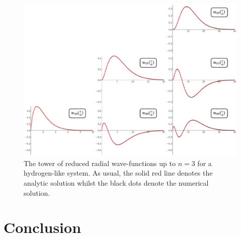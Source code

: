 \begin{figure}[h!tb]
    \centering
    \includegraphics[width=\linewidth]{hydrogen_wfs.pdf}
    \caption{The tower of reduced radial wave-functions up to $n = 3$ for a hydrogen-like system. As usual, the solid red line denotes the analytic solution whilst the black dots denote the numerical solution.}
    \label{fig:hydrogen-wfs}
\end{figure}



\section{Conclusion}
\label{sec:conclusion}


    

